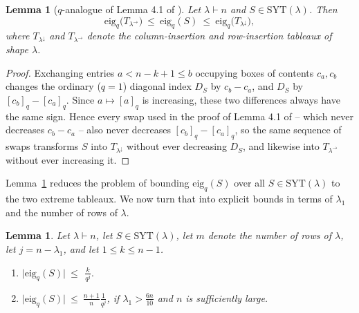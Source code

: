 \documentclass[11pt]{article}
\theoremstyle{plain}  %
\newtheorem{lemma}[theorem]{Lemma}
\newcommand{\eig}{\text{eig}} %
\begin{document}
\begin{lemma}[$q$-analogue of Lemma 4.1 of \cite{arfaee2025shuffling}]\label{lem:insertion}
Let $\lambda \vdash n$ and $S \in \mathrm{SYT}(\lambda)$. Then
$$
  \mathrm{eig}_q\bigl(T_{\lambda^{\to}}\bigr)\ \le\ \mathrm{eig}_q(S)\ \le\
  \mathrm{eig}_q\bigl(T_{\lambda^{\downarrow}}\bigr),
$$
where $T_{\lambda^{\downarrow}}$ and $T_{\lambda^{\to}}$ denote the
column-insertion and row-insertion tableaux of shape $\lambda$.
\end{lemma}


\begin{proof}
Exchanging entries $a<n-k+1\le b$ occupying boxes of contents $c_a,c_b$
changes the ordinary ($q=1$) diagonal index $D_S$ by $c_b-c_a$, and $D_S$
by $[c_b]_q-[c_a]_q$. Since $a\mapsto[a]_q$ is increasing, these two
differences always have the same sign. Hence every swap used in the proof of
Lemma 4.1 of \cite{arfaee2025shuffling} -- which never decreases $c_b-c_a$ -- also never decreases
$[c_b]_q-[c_a]_q$, so the same sequence of swaps transforms $S$ into
$T_{\lambda^{\downarrow}}$ without ever decreasing $D_S$, and likewise
into $T_{\lambda^{\to}}$ without ever increasing it.
\end{proof}

Lemma~\ref{lem:insertion} reduces the problem of bounding $\eig_q(S)$ over all
$S \in \mathrm{SYT}(\lambda)$ to the two extreme tableaux. We now turn that into explicit
bounds in terms of $\lambda_1$ and the number of rows of $\lambda$.

\begin{lemma}\label{lem:eigbounds}
Let $\lambda \vdash n$, let $S \in \mathrm{SYT}(\lambda)$, let $m$ denote the
number of rows of $\lambda$, let $j = n - \lambda_1$, and let
$1 \le k \le n-1$.
\begin{enumerate}
\item \(\displaystyle 
\bigl|\mathrm{eig}_q(S)\bigr|\ \le\ \,\frac{k}{q^j}.\)
\item \(\displaystyle \bigl|\mathrm{eig}_q(S)\bigr|\ \le\ \frac{n+1}{n} \frac{1}{q^{j}}\), if
$\lambda_1 > \frac{6n}{10}$ and $n$ is sufficiently
large.
\end{enumerate}
\end{lemma}
\end{document}
